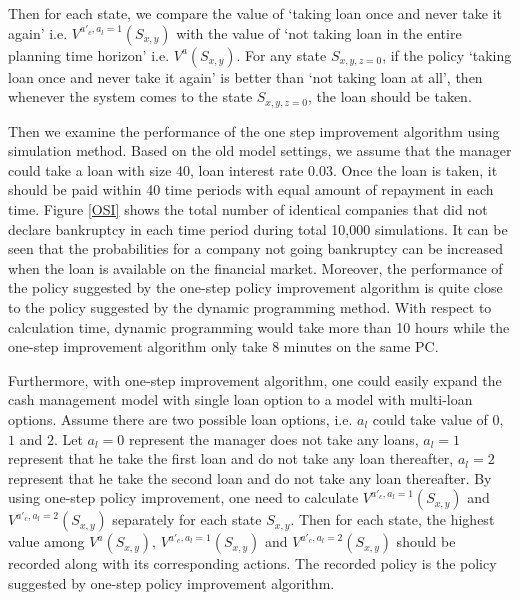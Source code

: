 \documentclass[12pt]{article}
\begin{document}
Then for each state, we compare the value of `taking loan once and never take it again' i.e. $V^{a'_c,a_l = 1}(S_{x,y})$ with the value of `not taking loan in the entire planning time horizon' i.e. $V^a(S_{x,y})$. For any state $S_{x,y,z=0}$, if the policy `taking loan once and never take it again' is better than `not taking loan at all', then whenever the system comes to the state $S_{x,y,z=0}$, the loan should be taken.

Then we examine the performance of the one step improvement algorithm using simulation method. Based on the old model settings, we assume that the manager could take a loan with size 40, loan interest rate 0.03. Once the loan is taken, it should be paid within 40 time periods with equal amount of repayment in each time. Figure \ref{OSI} shows the total number of identical companies that did not declare bankruptcy in each time period during total 10,000 simulations. It can be seen that the probabilities for a company not going bankruptcy can be increased when the loan is available on the financial market. Moreover, the performance of the policy suggested by the one-step policy improvement algorithm is quite close to the policy suggested by the dynamic programming method. With respect to calculation time, dynamic programming would take more than 10 hours while the one-step improvement algorithm only take 8 minutes on the same PC. 

Furthermore, with one-step improvement algorithm, one could easily expand the cash management model with single loan option to a model with multi-loan options. Assume there are two possible loan options, i.e. $a_l$ could take value of $0$, $1$ and $2$. Let $a_l = 0$ represent the manager does not take any loans, $a_l=1$ represent that he take the first loan and do not take any loan thereafter, $a_l=2$ represent that he take the second loan and do not take any loan thereafter. By using one-step policy improvement, one need to calculate $V^{a'_c, a_l=1}(S_{x,y})$ and $V^{a'_c, a_l=2}(S_{x,y})$ separately for each state $S_{x,y}$. Then for each state, the highest value among $V^a(S_{x,y})$, $V^{a'_c, a_l=1}(S_{x,y})$ and $V^{a'_c, a_l=2}(S_{x,y})$ should be recorded along with its corresponding actions. The recorded policy is the policy suggested by one-step policy improvement algorithm. 
\end{document}
